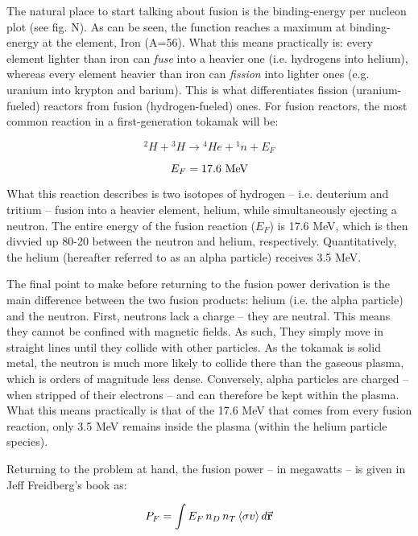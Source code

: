 The natural place to start talking about fusion is the binding-energy per nucleon plot (see fig. N). As can be seen, the function reaches a maximum at binding-energy at the element, Iron (A=56). What this means practically is: every element lighter than iron can \emph{fuse} into a heavier one (i.e. hydrogens into helium), whereas every element heavier than iron can \emph{fission} into lighter ones (e.g. uranium into krypton and barium). This is what differentiates fission (uranium-fueled) reactors from fusion (hydrogen-fueled) ones. For fusion reactors, the most common reaction in a first-generation tokamak will be:

\begin{equation}
	{}^2H+ {}^3H \rightarrow {}^4 He + {}^1 n + E_F
\end{equation}

\begin{equation}
	E_F = 17.6 \ \textnormal{MeV}
\end{equation}

What this reaction describes is two isotopes of hydrogen -- i.e. deuterium and tritium -- fusion into a heavier element, helium, while simultaneously ejecting a neutron. The entire energy of the fusion reaction ($E_F$) is 17.6 MeV, which is then divvied up 80-20 between the neutron and helium, respectively. Quantitatively, the helium (hereafter referred to as an alpha particle) receives 3.5 MeV.

The final point to make before returning to the fusion power derivation is the main difference between the two fusion products: helium (i.e. the alpha particle) and the neutron. First, neutrons lack a charge -- they are neutral. This means they cannot be confined with magnetic fields. As such, They simply move in straight lines until they collide with other particles. As the tokamak is solid metal, the neutron is much more likely to collide there than the gaseous plasma, which is orders of magnitude less dense. Conversely, alpha particles are charged -- when stripped of their electrons -- and can therefore be kept within the plasma. What this means practically is that of the 17.6 MeV that comes from every fusion reaction, only 3.5 MeV remains inside the plasma (within the helium particle species).
 
 Returning to the problem at hand, the fusion power -- in megawatts -- is given in Jeff Freidberg's book as:
 
 \begin{equation}
 	\label{eq:pf_int}
 	P_F = \int E_F \, n_D \, n_T \, \langle \sigma v \rangle \, d \vec{\bold{r}}
 \end{equation}
 
